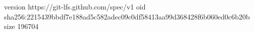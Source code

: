 version https://git-lfs.github.com/spec/v1
oid sha256:2215439bbdf7e188ad5c582adec09c0df58413aa99d368428f6b060ed0c6b20b
size 196704
